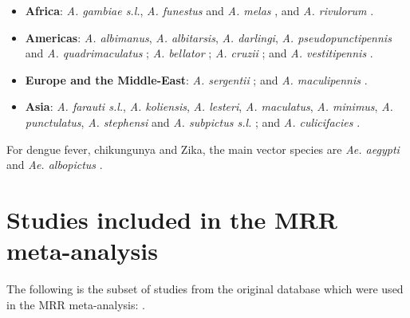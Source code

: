 \documentclass[12pt]{article}
\begin{document}
{\begin{itemize}
	\item \textbf{Africa}: \textit{A. gambiae s.l.}, \textit{A. funestus} and \textit{A. melas} \citep{sinka2012global}, and \textit{A. rivulorum} \citep{wilkes1996anopheles}.
	\item \textbf{Americas}: \textit{A. albimanus}, \textit{A. albitarsis}, \textit{A. darlingi}, \textit{A. pseudopunctipennis} and \textit{A. quadrimaculatus} \citep{sinka2012global}; \textit{A. bellator}  \citep{forattini1999role,lorenz2012morphometrical}; \textit{A. cruzii} \citep{lorenz2012morphometrical}; and \textit{A. vestitipennis} \citep{sinka2010dominant}.
	\item \textbf{Europe and the Middle-East}: \textit{A. sergentii} \citep{sinka2012global}; and \textit{A. maculipennis} \citep{hackett1935varieties}.
	\item \textbf{Asia}: \textit{A. farauti s.l.}, \textit{A. koliensis}, \textit{A. lesteri}, \textit{A. maculatus}, \textit{A. minimus}, \textit{A. punctulatus}, \textit{A. stephensi} and \textit{A. subpictus s.l.} \citep{sinka2012global}; and \textit{A. culicifacies} \citep{green1980chromosomal}.
\end{itemize}

For dengue fever, chikungunya and Zika, the main vector species are \textit{Ae. aegypti} and \textit{Ae. albopictus} \citep{kraemer2015global,grard2014zika,benelli2016declining}. 


\section{Studies included in the MRR meta-analysis}\label{sec:appendix_mrrStudyList}
The following is the subset of studies from the original \cite{guerra2014global} database which were used in the MRR meta-analysis: \cite{marini2010study,baber2010population,lacroix2009dispersal,maciel2008calculating,midega2007estimating,maciel2007daily,elizondo2006gonotrophic,ba2005aspects,fabian2005mark,la2004anopheles,watson2000aedes,harrington2001analysis,tsuda2001movement,muir1998aedes,toure1998mark,quinones1997anopheles,costantini1996density,trpis1995estimates,jensen1994comparison,fernandez1994gonotrophic,jaal1992mark,rodriguez1992gonotrophic,chiang1991capture,jensen1991assessment,eldridge1990daily,macdonald1968mark,pumpuni1989population,charlwood1987mark,charlwood1989capture,birley1989effect,arredondo1998gonotrophic,hii1990estimation,renshaw1994host,milby1989estimation,maciel2007body,loong1990survival,nelson1980dispersal,maciel2006movement,mcdonald1977population,curtis1980preliminary,rawlings1982dispersal,conway1974population,reisen1979anopheles,nelson1978estimates,rawlings1981influence,sempala1981ecology,takagi1995movement,buei1980field,eyles1943experiment,ordonez2001use,pant1973field,charlwood1988evidence,reisen1982anopheles,nayar1980quantitative,carnevale1979etude,eyles1946long,reisen1984impact,charlwood1986capture,trpis1975demonstration,lutwama1994mark,wada1969dispersal,takken1998dispersal,abdel1966study,valerio2012dispersal,zetek1915behavior,takagi1995movement,yasuno1975migration,eyles1943measurement,germain1974evaluation}.

}
\end{document}
